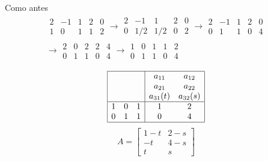 \documentclass{beamer}
\begin{document}
\begin{frame}{Como antes}
\begin{gather*}
 \begin{array}{ccc|cc}
  2& -1 &1 & 2 & 0 \\
  1 & 0 & 1& 1 & 2
 \end{array} \rightarrow \begin{array}{ccc|cc}
  2& -1 &1 & 2 & 0 \\
  0 & 1/2 & 1/2 & 0 & 2
 \end{array} \rightarrow \begin{array}{ccc|cc}
  2& -1 &1 & 2 & 0 \\
  0 & 1 & 1& 0 & 4
 \end{array} \\
 \rightarrow \begin{array}{ccc|cc}
  2& 0 &2 & 2 & 4 \\
  0 & 1 & 1& 0 & 4
 \end{array} \rightarrow \begin{array}{ccc|cc}
  1& 0 &1 & 1 & 2 \\
  0 & 1 & 1& 0 & 4
 \end{array}
\end{gather*}
 \end{frame}

\begin{frame}
$$
\begin{array}{|ccc|cc|} \hline
  & & & a_{11} & a_{12} \\ 
  & & & a_{21} & a_{22} \\ 
  & & & a_{31} (t) & a_{32} (s)\\ \hline
  1& 0 &1 & 1 & 2 \\
  0 & 1 & 1& 0 & 4 \\ \hline
  \end{array}
$$\pause 
$$ A = \begin{bmatrix}
  1-t & 2-s\\
  -t & 4-s\\
  t & s
\end{bmatrix} $$
\end{frame}
\begin{frame}
  
\end{frame}
\end{document}
